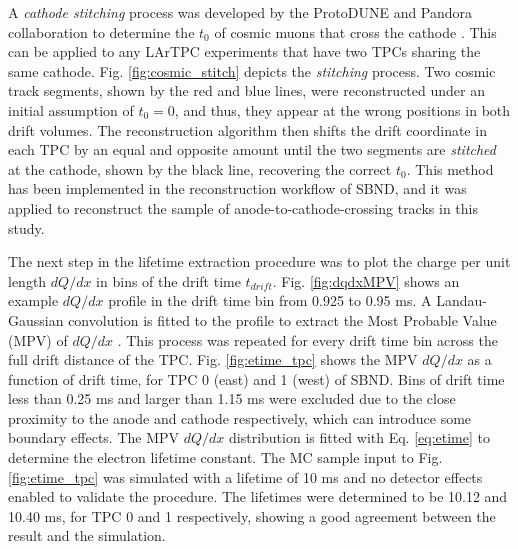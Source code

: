 A \textit{cathode stitching} process was developed by the ProtoDUNE and Pandora collaboration to determine the $t_{0}$ of cosmic muons that cross the cathode \cite{pandora_protodune}.
This can be applied to any LArTPC experiments that have two TPCs sharing the same cathode.
Fig. \ref{fig:cosmic_stitch} depicts the \textit{stitching} process.
Two cosmic track segments, shown by the red and blue lines, were reconstructed under an initial assumption of $t_{0} = 0$, and thus, they appear at the wrong positions in both drift volumes.
The reconstruction algorithm then shifts the drift coordinate in each TPC by an equal and opposite amount until the two segments are \textit{stitched} at the cathode, shown by the black line, recovering the correct $t_{0}$.
This method has been implemented in the reconstruction workflow of SBND, and it was applied to reconstruct the sample of anode-to-cathode-crossing tracks in this study.

The next step in the lifetime extraction procedure was to plot the charge per unit length $dQ/dx$ in bins of the drift time $t_{drift}$.
Fig. \ref{fig:dqdxMPV} shows an example $dQ/dx$ profile in the drift time bin from 0.925 to 0.95 ms.
A Landau-Gaussian convolution is fitted to the profile to extract the Most Probable Value (MPV) of $dQ/dx$ \cite{Passage}.
This process was repeated for every drift time bin across the full drift distance of the TPC.
Fig. \ref{fig:etime_tpc} shows the MPV $dQ/dx$ as a function of drift time, for TPC 0 (east) and 1 (west) of SBND.                                                                          
Bins of drift time less than 0.25 ms and larger than 1.15 ms were excluded due to the close proximity to the anode and cathode respectively, which can introduce some boundary effects.
The MPV $dQ/dx$ distribution is fitted with Eq. \ref{eq:etime} to determine the electron lifetime constant.
The MC sample input to Fig. \ref{fig:etime_tpc} was simulated with a lifetime of 10 ms and no detector effects enabled to validate the procedure.                                       
The lifetimes were determined to be 10.12 and 10.40 ms, for TPC 0 and 1 respectively, showing a good agreement between the result and the simulation. 


